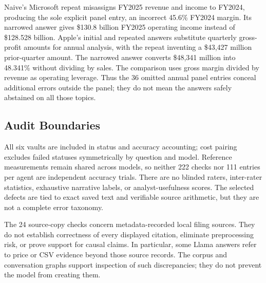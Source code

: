 \documentclass[letterpaper]{article} %
\begin{document}
Naive's Microsoft repeat misassigns FY2025 revenue and income to FY2024, producing the sole explicit panel entry, an incorrect 45.6\% FY2024 margin. Its narrowed answer gives \$130.8 billion FY2025 operating income instead of \$128.528 billion. Apple's initial and repeated answers substitute quarterly gross-profit amounts for annual analysis, with the repeat inventing a \$43,427 million prior-quarter amount. The narrowed answer converts \$48,341 million into 48.341\% without dividing by sales. The comparison uses gross margin divided by revenue as operating leverage. Thus the 36 omitted annual panel entries conceal additional errors outside the panel; they do not mean the answers safely abstained on all those topics.

\subsection{Audit Boundaries}
All six vaults are included in status and accuracy accounting; cost pairing excludes failed statuses symmetrically by question and model. Reference measurements remain shared across models, so neither 222 checks nor 111 entries per agent are independent accuracy trials. There are no blinded raters, inter-rater statistics, exhaustive narrative labels, or analyst-usefulness scores. The selected defects are tied to exact saved text and verifiable source arithmetic, but they are not a complete error taxonomy.

The 24 source-copy checks concern metadata-recorded local filing sources. They do not establish correctness of every displayed citation, eliminate preprocessing risk, or prove support for causal claims. In particular, some Llama answers refer to price or CSV evidence beyond those source records. The corpus and conversation graphs support inspection of such discrepancies; they do not prevent the model from creating them.
\end{document}
